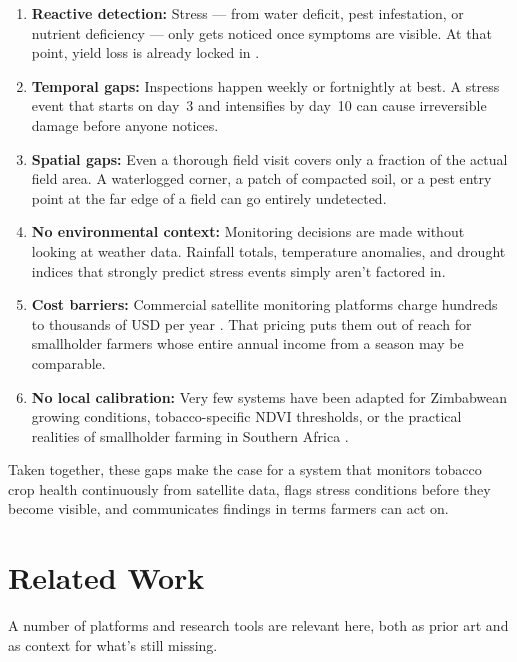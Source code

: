 \documentclass[12pt,a4paper]{report}
\begin{document}
\begin{enumerate}
  \item \textbf{Reactive detection:} Stress — from water deficit, pest infestation, or nutrient deficiency — only gets noticed once symptoms are visible. At that point, yield loss is already locked in \citep{nyoka2020}.

  \item \textbf{Temporal gaps:} Inspections happen weekly or fortnightly at best. A stress event that starts on day~3 and intensifies by day~10 can cause irreversible damage before anyone notices.

  \item \textbf{Spatial gaps:} Even a thorough field visit covers only a fraction of the actual field area. A waterlogged corner, a patch of compacted soil, or a pest entry point at the far edge of a field can go entirely undetected.

  \item \textbf{No environmental context:} Monitoring decisions are made without looking at weather data. Rainfall totals, temperature anomalies, and drought indices that strongly predict stress events simply aren't factored in.

  \item \textbf{Cost barriers:} Commercial satellite monitoring platforms charge hundreds to thousands of USD per year \citep{wolfert2017}. That pricing puts them out of reach for smallholder farmers whose entire annual income from a season may be comparable.

  \item \textbf{No local calibration:} Very few systems have been adapted for Zimbabwean growing conditions, tobacco-specific NDVI thresholds, or the practical realities of smallholder farming in Southern Africa \citep{rwizi2021}.
\end{enumerate}

Taken together, these gaps make the case for a system that monitors tobacco crop health continuously from satellite data, flags stress conditions before they become visible, and communicates findings in terms farmers can act on.

\section{Related Work}

A number of platforms and research tools are relevant here, both as prior art and as context for what's still missing.
\end{document}
